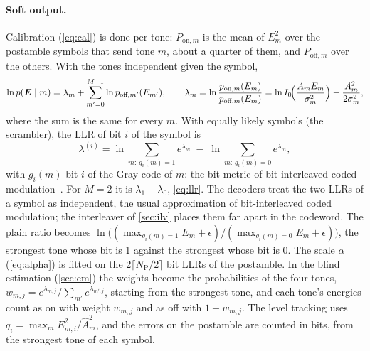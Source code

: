 \documentclass[11pt,a4paper]{article}
\newcommand{\NP}{N_{\mathrm{P}}}
\theoremstyle{remark}
\begin{document}
\paragraph{Soft output.}
Calibration (\cref{eq:cal}) is done per tone: $P_{\text{on},m}$ is the mean of $E_m^2$ over the postamble symbols that send tone $m$, about a quarter of them, and $P_{\text{off},m}$ over the others. With the tones independent given the symbol,
\begin{equation}
\ln p(\bm E \mid m) = \lambda_m + \sum_{m'=0}^{M-1} \ln p_{\text{off},m'}(E_{m'}), \qquad
\lambda_m = \ln \frac{p_{\text{on},m}(E_m)}{p_{\text{off},m}(E_m)} = \ln I_0\!\Bigl(\frac{A_m E_m}{\sigma_m^2}\Bigr) - \frac{A_m^2}{2\sigma_m^2},
\end{equation}
where the sum is the same for every $m$. With equally likely symbols (the scrambler), the LLR of bit $i$ of the symbol is
\begin{equation}
\lambda^{(i)} = \ln \sum_{m:\, g_i(m) = 1} e^{\lambda_m} \;-\; \ln \sum_{m:\, g_i(m) = 0} e^{\lambda_m},
\label{eq:bicm}
\end{equation}
with $g_i(m)$ bit $i$ of the Gray code of $m$: the bit metric of bit-interleaved coded modulation~\cite{bicm}. For $M = 2$ it is $\lambda_1 - \lambda_0$, \cref{eq:llr}. The decoders treat the two LLRs of a symbol as independent, the usual approximation of bit-interleaved coded modulation; the interleaver of \cref{sec:ilv} places them far apart in the codeword. The plain ratio becomes $\ln\bigl((\max_{g_i(m)=1} E_m + \epsilon)/(\max_{g_i(m)=0} E_m + \epsilon)\bigr)$, the strongest tone whose bit is 1 against the strongest whose bit is 0. The scale $\alpha$ (\cref{eq:alpha}) is fitted on the $2\lceil \NP/2 \rceil$ bit LLRs of the postamble. In the blind estimation (\cref{sec:em}) the weights become the probabilities of the four tones, $w_{m,j} = e^{\lambda_{m,j}} / \sum_{m'} e^{\lambda_{m',j}}$, starting from the strongest tone, and each tone's energies count as on with weight $w_{m,j}$ and as off with $1 - w_{m,j}$. The level tracking uses $q_i = \max_m E_{m,i}^2/\hat A_m^2$, and the errors on the postamble are counted in bits, from the strongest tone of each symbol.
\end{document}
